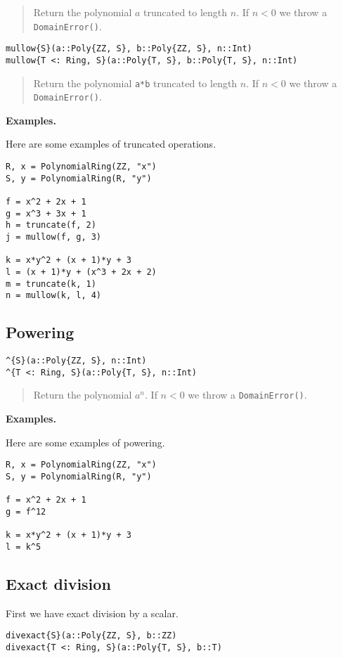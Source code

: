 \documentclass[a4paper,10pt]{article}
\newcommand{\code}{\lstinline}
\newcommand{\desc}[1]{\vspace{-3mm}\begin{quote}#1\end{quote}}
\begin{document}
{{{\desc{Return the polynomial $a$ truncated to length $n$. If $n < 0$ we throw a
\code{DomainError()}.}

\begin{lstlisting}
mullow{S}(a::Poly{ZZ, S}, b::Poly{ZZ, S}, n::Int)
mullow{T <: Ring, S}(a::Poly{T, S}, b::Poly{T, S}, n::Int)
\end{lstlisting}

\desc{Return the polynomial \code{a*b} truncated to length $n$. If $n < 0$ we
throw a \code{DomainError()}.}

\textbf{Examples.}

Here are some examples of truncated operations.

\begin{lstlisting}
R, x = PolynomialRing(ZZ, "x")
S, y = PolynomialRing(R, "y")

f = x^2 + 2x + 1
g = x^3 + 3x + 1
h = truncate(f, 2)
j = mullow(f, g, 3)

k = x*y^2 + (x + 1)*y + 3
l = (x + 1)*y + (x^3 + 2x + 2)
m = truncate(k, 1)
n = mullow(k, l, 4)
\end{lstlisting}

\subsection{Powering}

\begin{lstlisting}
^{S}(a::Poly{ZZ, S}, n::Int)
^{T <: Ring, S}(a::Poly{T, S}, n::Int)
\end{lstlisting}

\desc{Return the polynomial $a^n$. If $n < 0$ we throw a \code{DomainError()}.}

\textbf{Examples.}

Here are some examples of powering.

\begin{lstlisting}
R, x = PolynomialRing(ZZ, "x")
S, y = PolynomialRing(R, "y")

f = x^2 + 2x + 1
g = f^12

k = x*y^2 + (x + 1)*y + 3
l = k^5
\end{lstlisting}

\subsection{Exact division}

First we have exact division by a scalar.

\begin{lstlisting}
divexact{S}(a::Poly{ZZ, S}, b::ZZ)
divexact{T <: Ring, S}(a::Poly{T, S}, b::T)
\end{lstlisting}

}}}
\end{document}
